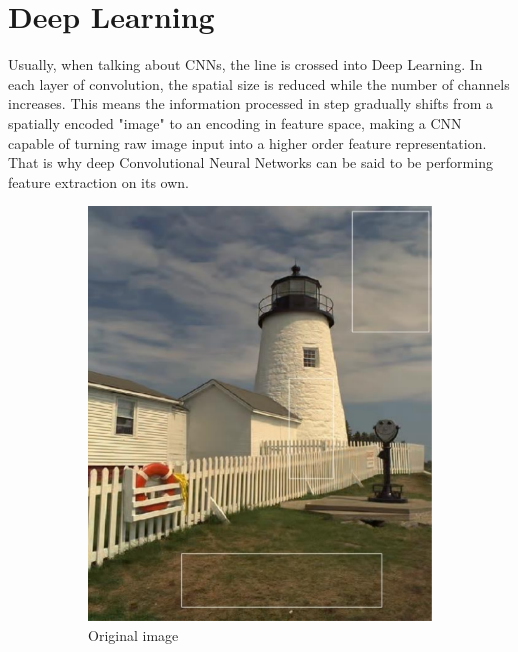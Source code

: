 \section{Deep Learning}
Usually, when talking about CNNs, the line is crossed into Deep Learning. In each layer of convolution, the spatial size is reduced while the number of channels increases. This means the information processed in step gradually shifts from a spatially encoded "image" to an encoding in feature space, making a CNN capable of turning raw image input into a higher order feature representation. That is why deep Convolutional Neural Networks can be said to be performing feature extraction on its own.

\begin{figure}
    \begin{subfigure}[ht]{0.49\linewidth}
        \includegraphics[width=\linewidth]{Chapters/2.Background/figures/original.png}
        \caption{Original image}
    \end{subfigure}
    \hfill
    \begin{subfigure}[ht]{0.49\linewidth}

\end{subfigure}
\end{figure}
